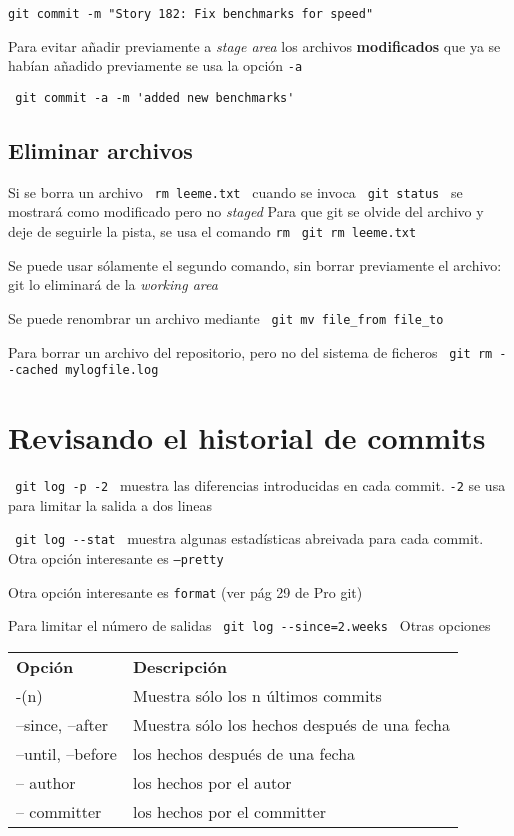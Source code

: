 \documentclass[]{article}
\begin{document}
\verb=git commit -m "Story 182: Fix benchmarks for speed"=

Para evitar añadir previamente a \textit{stage area} los archivos \textbf{modificados} que ya se habían añadido previamente  se usa la opción \texttt{-a} 

\verb= git commit -a -m 'added new benchmarks' =

\subsection*{Eliminar archivos}

Si se borra un archivo \verb= rm leeme.txt = cuando se invoca \verb= git status = se mostrará como modificado pero no \textit{staged} Para que git se olvide del archivo y deje de seguirle la pista, se usa el comando \texttt{rm} \verb= git rm leeme.txt = 

Se puede usar sólamente el segundo comando, sin borrar previamente el archivo: git lo eliminará de la \textit{working area}

Se puede renombrar un archivo mediante \verb= git mv file_from file_to =

Para borrar un archivo del repositorio, pero no del sistema de ficheros \verb= git rm --cached mylogfile.log =

\section{Revisando el historial de commits}

\verb= git log -p -2 = muestra las diferencias introducidas en cada commit. \texttt{-2} se usa para limitar la salida a dos lineas

\verb= git log --stat = muestra algunas estadísticas abreivada para cada commit. Otra opción interesante es \texttt{--pretty}

Otra opción interesante es \texttt{format} (ver pág 29 de Pro git)

Para limitar el número de salidas \verb+ git log --since=2.weeks + Otras opciones

\begin{tabular}{ll}
	\textbf{Opción} & \textbf{Descripción}\\
	-(n) & Muestra sólo los n últimos commits\\
	--since, --after & Muestra sólo los hechos después de una fecha\\
	--until, --before & los hechos después de una fecha\\
	-- author & los hechos por el autor\\
	-- committer & los hechos por el committer\\
\end{tabular}
\end{document}
